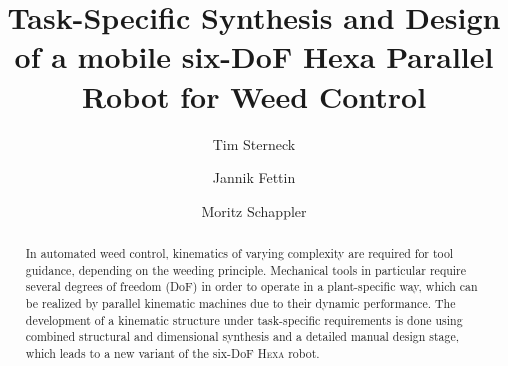 \documentclass[runningheads]{llncs}
\begin{document}
%
\title{Task-Specific Synthesis and Design of a mobile six-DoF Hexa Parallel Robot for Weed Control}

%


\author{Tim Sterneck \and 
Jannik Fettin \and
Moritz Schappler }
%
%
%
\maketitle              %
%
\begin{abstract}
In automated weed control, kinematics of varying complexity are required for tool guidance, depending on the weeding principle. 
Mechanical tools in particular require several degrees of freedom (DoF) in order to operate in a plant-specific way, which can be realized by parallel kinematic machines due to their dynamic performance. 
The development of a kinematic structure under task-specific requirements is done using combined structural and dimensional synthesis and a detailed manual design stage, which leads to a new variant of the six-DoF \textsc{Hexa} robot. %
\end{abstract}
%
\end{document}
